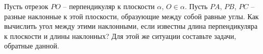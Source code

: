 Пусть отрезок $PO$ -- перпендикуляр к плоскости $\alpha$, $O\in\alpha$. Пусть $PA$, $PB$, $PC$ -- разные наклонные к этой плоскости, образующие между собой равные углы. Как вычислить угол между этими наклонными, если известны длина перпендикуляра к плоскости и длины наклонных? Для этой же ситуации составьте задачи, обратные данной.